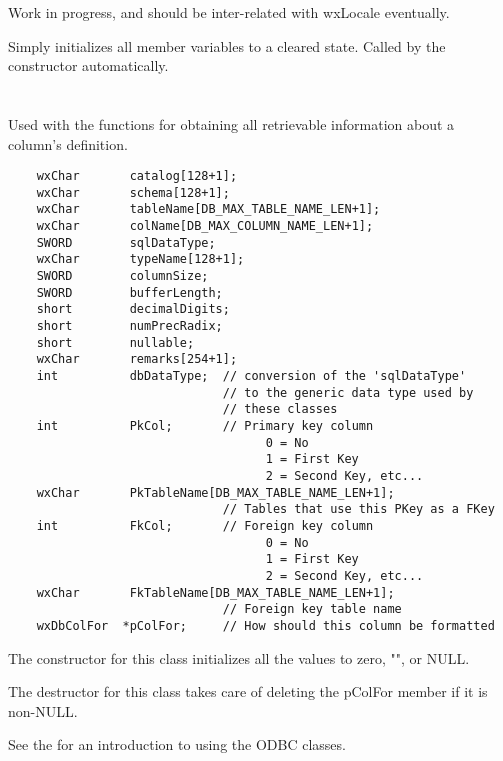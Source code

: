 Work in progress, and should be inter-related with wxLocale eventually.

\label{wxdbcolforinitialize}

Simply initializes all member variables to a cleared state.  Called by
the constructor automatically.

\section{}\label{wxdbcolinf}

Used with the  functions for obtaining all retrievable information about a column's definition.

\begin{verbatim}
    wxChar       catalog[128+1];
    wxChar       schema[128+1];
    wxChar       tableName[DB_MAX_TABLE_NAME_LEN+1];
    wxChar       colName[DB_MAX_COLUMN_NAME_LEN+1];
    SWORD        sqlDataType;
    wxChar       typeName[128+1];
    SWORD        columnSize;
    SWORD        bufferLength;
    short        decimalDigits;
    short        numPrecRadix;
    short        nullable;
    wxChar       remarks[254+1];
    int          dbDataType;  // conversion of the 'sqlDataType'
                              // to the generic data type used by
                              // these classes
    int          PkCol;       // Primary key column
                                    0 = No
                                    1 = First Key
                                    2 = Second Key, etc...
    wxChar       PkTableName[DB_MAX_TABLE_NAME_LEN+1];
                              // Tables that use this PKey as a FKey
    int          FkCol;       // Foreign key column
                                    0 = No
                                    1 = First Key
                                    2 = Second Key, etc...
    wxChar       FkTableName[DB_MAX_TABLE_NAME_LEN+1];
                              // Foreign key table name
    wxDbColFor  *pColFor;     // How should this column be formatted
\end{verbatim}

The constructor for this class initializes all the values to zero, "", or NULL.

The destructor for this class takes care of deleting the pColFor member if
it is non-NULL.

See the  for
an introduction to using the ODBC classes.


